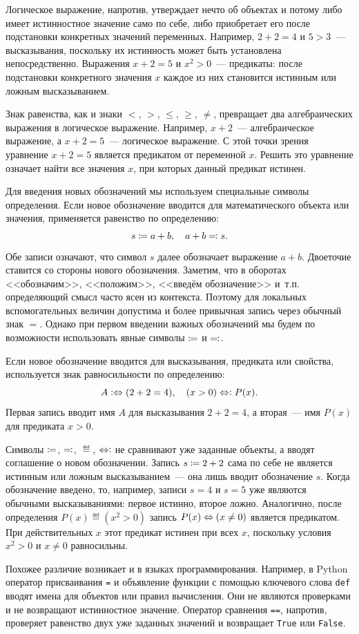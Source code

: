 Логическое выражение, напротив, утверждает нечто об объектах и потому либо имеет истинностное значение само по себе, либо приобретает его после подстановки конкретных значений переменных.
Например, $2 + 2 = 4$ и $5 > 3$~--- высказывания, поскольку их истинность может быть установлена непосредственно.
Выражения $x + 2 = 5$ и $x^2 > 0$~--- предикаты: после подстановки конкретного значения $x$ каждое из них становится истинным или ложным высказыванием.

Знак равенства, как и знаки $<$, $>$, $\le$, $\ge$, $\ne$, превращает два алгебраических выражения в логическое выражение.
Например, $x + 2$~--- алгебраическое выражение, а $x + 2 = 5$~--- логическое выражение.
С этой точки зрения уравнение $x + 2 = 5$ является предикатом от переменной $x$.
Решить это уравнение означает найти все значения $x$, при которых данный предикат истинен.

Для введения новых обозначений мы используем специальные символы определения.
Если новое обозначение вводится для математического объекта или значения, применяется равенство по определению:
\begin{equation*}
    s \coloneqq a + b,
    \quad
    a + b \eqqcolon s.
\end{equation*}
Обе записи означают, что символ $s$ далее обозначает выражение $a + b$.
Двоеточие ставится со стороны нового обозначения.
Заметим, что в оборотах <<обозначим>>, <<положим>>, <<введём обозначение>> и~т.п. определяющий смысл часто ясен из контекста.
Поэтому для локальных вспомогательных величин допустима и более привычная запись через обычный знак $=$.
Однако при первом введении важных обозначений мы будем по возможности использовать явные символы $\coloneqq$ и $\eqqcolon$.

Если новое обозначение вводится для высказывания, предиката или свойства, используется знак равносильности по определению:
\begin{equation*}
    A \mathrel{\vcentcolon\Leftrightarrow} (2 + 2 = 4),
    \quad
    (x > 0) \mathrel{\Leftrightarrow\vcentcolon} P(x).
\end{equation*}
Первая запись вводит имя $A$ для высказывания $2 + 2 = 4$, а вторая~--- имя $P(x)$ для предиката $x > 0$.

Символы $\coloneqq$, $\eqqcolon$, $\eqdef$, $\mathrel{\Leftrightarrow\vcentcolon}$ не сравнивают уже заданные объекты, а вводят соглашение о новом обозначении.
Запись $s \coloneqq 2 + 2$ сама по себе не является истинным или ложным высказыванием~--- она лишь вводит обозначение $s$.
Когда обозначение введено, то, например, записи $s = 4$ и $s = 5$ уже являются обычными высказываниями: первое истинно, второе ложно.
Аналогично, после определения $P(x) \eqdef (x^2 > 0)$ запись $P(x) \eq (x \ne 0)$ является предикатом.
При действительных $x$ этот предикат истинен при всех $x$, поскольку условия $x^2 > 0$ и $x \ne 0$ равносильны.

Похожее различие возникает и в языках программирования.
Например, в Python оператор присваивания \texttt{=} и объявление функции с помощью ключевого слова \texttt{def} вводят имена для объектов или правил вычисления.
Они не являются проверками и не возвращают истинностное значение.
Оператор сравнения \texttt{==}, напротив, проверяет равенство двух уже заданных значений и возвращает \texttt{True} или \texttt{False}.